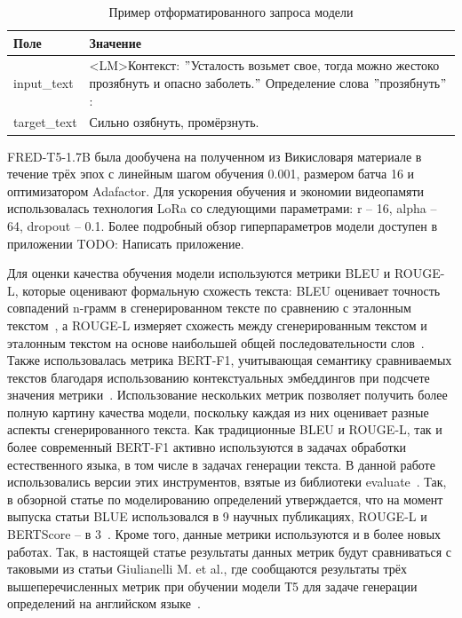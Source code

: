 \documentclass[LI,VKR]{HSEUniversity}
\begin{document}
\begin{table}[h]
\centering
\caption{Пример отформатированного запроса модели}
\begin{tabular}{|m{2.5cm}|m{9.5cm}|}
\hline
\textbf{Поле}       & \textbf{Значение}                                                                                          \\
\hline
input\_text  & <LM>Контекст: \("\)Усталость возьмет свое, тогда можно жестоко прозябнуть и опасно заболеть.\("\) Определение слова \("\)прозябнуть\("\): \\
\hline
target\_text & Сильно озябнуть, промёрзнуть.                                                                              \\
\hline
\end{tabular}
\end{table}

FRED-T5-1.7B была дообучена на полученном из Викисловаря материале в течение трёх эпох
с линейным шагом обучения 0.001, размером батча 16 и оптимизатором Adafactor.
Для ускорения обучения и экономии видеопамяти использовалась технология LoRa со
следующими параметрами: r – 16, alpha – 64, dropout – 0.1.
Более подробный обзор гиперпараметров модели доступен в приложении TODO: Написать приложение.

Для оценки качества обучения модели используются метрики BLEU и ROUGE-L,
которые оценивают формальную схожесть текста: BLEU оценивает точность совпадений n-грамм
в сгенерированном тексте по сравнению с эталонным текстом~\cite{BLUE}, а ROUGE-L измеряет схожесть между
сгенерированным текстом и эталонным текстом на основе наибольшей общей последовательности слов~\cite{ROUGE}.
Также использовалась метрика BERT-F1, учитывающая семантику сравниваемых текстов благодаря
использованию контекстуальных эмбеддингов при подсчете значения метрики~\cite{BERTScore}.
Использование нескольких метрик позволяет получить более полную картину качества модели,
поскольку каждая из них оценивает разные аспекты сгенерированного текста.
Как традиционные BLEU и ROUGE-L, так и более современный BERT-F1 активно используются в
задачах обработки естественного языка, в том числе в задачах генерации текста.
В данной работе использовались версии этих инструментов, взятые из библиотеки evaluate~\cite{Evaluate}.
Так, в обзорной статье по моделированию определений утверждается, что на момент выпуска статьи BLUE
использовался в 9 научных публикациях, ROUGE-L и BERTScore – в 3~\cite{DefinitionModelingReviewAndDatasetAnalysis}.
Кроме того, данные метрики используются и в более новых работах.
Так, в настоящей статье результаты данных метрик будут сравниваться с таковыми из статьи
Giulianelli M. et al., где сообщаются результаты трёх вышеперечисленных метрик при обучении модели
Т5 для задаче генерации определений на английском языке~\cite{DefinitionGenerationMainArticle}.
\end{document}
